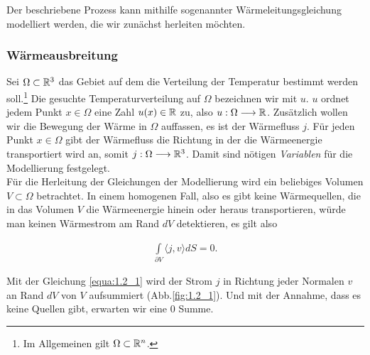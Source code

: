 Der beschriebene Prozess kann mithilfe sogenannter Wärmeleitungsgleichung modelliert werden, die wir zunächst herleiten möchten.

\subsubsection*{Wärmeausbreitung}
Sei $\Omega \subset \mathbb{R}^{3}$ das Gebiet auf dem die Verteilung der Temperatur bestimmt werden soll.\footnote{\label{foot:1.1.1} Im Allgemeinen gilt $\Omega \subset \mathbb{R}^n$.} Die gesuchte Temperaturverteilung auf $\Omega$ bezeichnen wir mit $u$. $u$ ordnet jedem Punkt $x \in \Omega$ eine Zahl $u(x) \in \mathbb{R}$ zu, also $u:\Omega \longrightarrow \mathbb{R}$. Zusätzlich wollen wir die Bewegung der Wärme in $\Omega$ auffassen, es ist der Wärmefluss $j$. Für jeden Punkt $x \in \Omega$ gibt der Wärmefluss die Richtung in der die Wärmeenergie transportiert wird an, somit $j:\Omega \longrightarrow \mathbb{R}^3$. Damit sind nötigen \textit{Variablen} für die Modellierung festgelegt.\\

Für die Herleitung der Gleichungen der Modellierung wird ein beliebiges Volumen $V \subset \Omega$ betrachtet. In einem homogenen Fall, also es gibt keine Wärmequellen, die in das Volumen $V$ die Wärmeenergie hinein oder heraus transportieren, würde man keinen Wärmestrom am Rand $dV$ detektieren, es gilt also

\begin{eqnarray}
	\int\limits_{\partial V} \langle j, v \rangle dS = 0.
	\label{equa:1.2_1}
\end{eqnarray}

Mit der Gleichung \ref{equa:1.2_1} wird der Strom $j$ in Richtung jeder Normalen $v$ an Rand $dV$ von $V$ aufsummiert (Abb.\ref{fig:1.2_1}). Und mit der Annahme, dass es keine Quellen gibt, erwarten wir eine 0 Summe.

